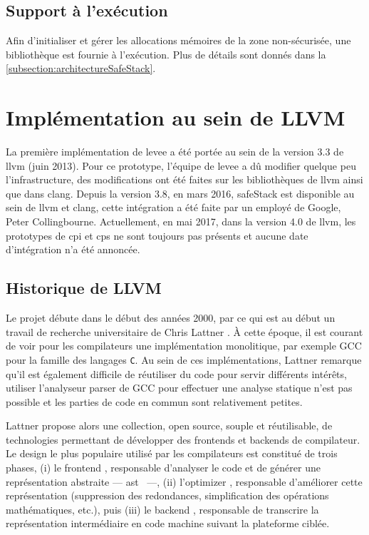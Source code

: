 \subsection{Support à l'exécution}

Afin d'initialiser et gérer les allocations mémoires de la zone non-sécurisée, une bibliothèque est fournie à l'exécution. Plus de détails sont donnés dans la \autoref{subsection:architectureSafeStack}.

\section{Implémentation au sein de LLVM}

La première implémentation de \gls{levee} a été portée au sein de la version 3.3 de \gls{llvm} (juin 2013). Pour ce prototype, l'équipe de \gls{levee} a dû modifier quelque peu l'infrastructure, des modifications ont été faites sur les bibliothèques de \gls{llvm} ainsi que dans \gls{clang}. Depuis la version 3.8, en mars 2016, \og \gls{safeStack} \fg est disponible au sein de \gls{llvm} et \gls{clang}, cette intégration a été faite par un employé de Google, Peter Collingbourne. Actuellement, en mai 2017, dans la version 4.0 de \gls{llvm}, les prototypes de \gls{cpi} et \gls{cps} ne sont toujours pas présents et aucune date d'intégration n'a été annoncée.

\subsection{Historique de LLVM}

Le projet débute dans le début des années 2000, par ce qui est au début un travail de recherche universitaire de Chris Lattner \cite{ChrisLattner}. À cette époque, il est courant de voir pour les compilateurs une implémentation monolitique, par exemple GCC pour la famille des langages \texttt{C}. Au sein de ces implémentations, Lattner remarque qu'il est également difficile de réutiliser du code pour servir différents intérêts, utiliser l'analyseur \og parser \fg de GCC pour effectuer une analyse statique n'est pas possible et les parties de code en commun sont relativement petites.

Lattner propose alors une collection, open source, souple et réutilisable, de technologies permettant de développer des \og frontends \fg et \og backends \fg de compilateur. Le design le plus populaire utilisé par les compilateurs est constitué de trois phases, (i) le \og frontend \fg, responsable d'analyser le code et de générer une représentation abstraite --- \og \gls{ast} \fg \ ---, (ii) l'\og optimizer \fg, responsable d'améliorer cette représentation (suppression des redondances, simplification des opérations mathématiques, etc.), puis (iii) le \og backend \fg, responsable de transcrire la représentation intermédiaire en code machine suivant la plateforme ciblée.

